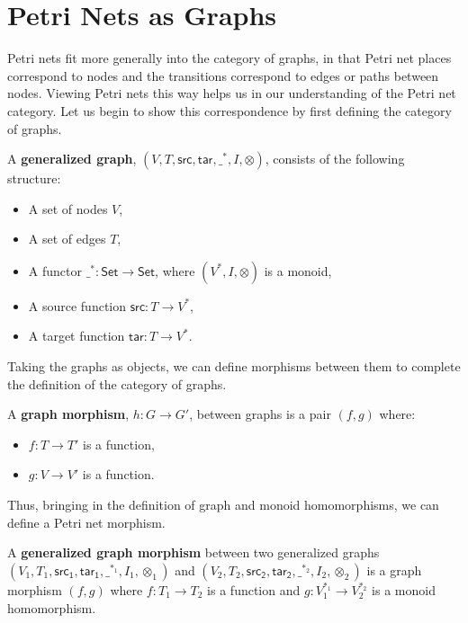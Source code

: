 \section{Petri Nets as Graphs}
Petri nets fit more generally into the category of graphs, in that Petri net places correspond to nodes and the transitions correspond to edges or paths between nodes. Viewing Petri nets this way helps us in our understanding of the Petri net category. Let us begin to show this correspondence by first defining the category of graphs. 
\begin{definition}
  \label{def:Graph}
  A \textbf{generalized graph}, $(V, T, \mathsf{src}, \mathsf{tar}, \_^*,I,\otimes)$, consists of the following structure:
  \begin{itemize}
  \item A set of nodes $V$,
  \item A set of edges $T$,
  \item A functor $\_^* : \mathsf{Set} \to \mathsf{Set}$, where
    $(V^*,I,\otimes)$ is a monoid,
  \item A source function $\mathsf{src} : T \to V^*$,
  \item A target function $\mathsf{tar} : T \to V^*$.
  \end{itemize}
\end{definition}
% 
Taking the graphs as objects, we can define morphisms between them to complete the definition of the category of graphs.  
\begin{definition}
  \label{def:Graph-Morphism}
  A \textbf{graph morphism}, $h : G \to G'$, between graphs is a pair $(f, g)$ where:
  \begin{itemize}
  \item $f: T \to T'$ is a function,
  \item $g: V \to V'$ is a function.
  \end{itemize}
\end{definition}
Thus, bringing in the definition of graph and monoid homomorphisms, we can define a Petri net morphism.
\begin{definition}
  \label{Petri-net-morphism}
  A \textbf{generalized graph morphism} between two generalized graphs\\
  $(V_1, T_1, \mathsf{src_1}, \mathsf{tar_1}, \_^{*_1},I_1,\otimes_1)$ and
  $(V_2, T_2, \mathsf{src_2}, \mathsf{tar_2}, \_^{*_2},I_2,\otimes_2)$ is a graph morphism
  $(f, g)$ where $f : T_1 \to T_2$ is a function and
  $g: V_1^{*_1} \to V_2^{*_2}$ is a monoid homomorphism.
\end{definition}
